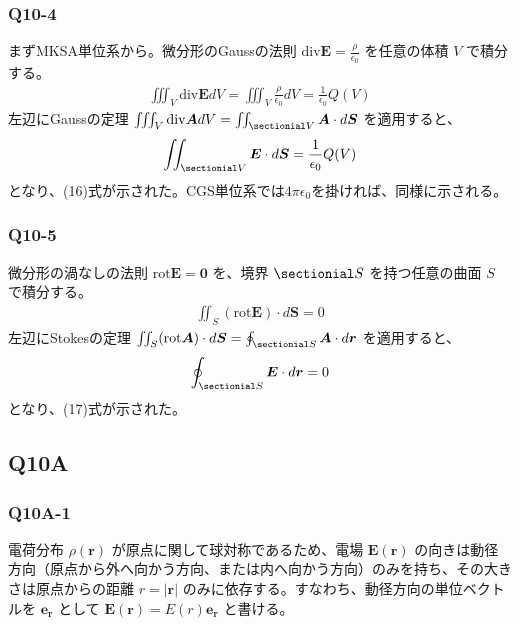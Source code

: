 \documentclass[platex,dvipdfmx,a4paper]{jsarticle}
\newcommand{\vect}[1]{\boldsymbol{#1}}
\begin{document}
  \subsubsection*{Q10-4}
  まずMKSA単位系から。微分形のGaussの法則 $\text{div} \vect{E} = \frac{\rho}{\epsilon_0}$ を任意の体積 $V$ で積分する。
  \begin{align*}
    \iiint_V \text{div} \vect{E} dV = \iiint_V \frac{\rho}{\epsilon_0} dV = \frac{1}{\epsilon_0} Q(V)
  \end{align*}
  左辺にGaussの定理 $\iiint_V \text{div} \vect{A} dV = \iint_{\sectionial V} \vect{A} \cdot d\vect{S}$ を適用すると、
  \begin{align*}
    \iint_{\sectionial V} \vect{E} \cdot d\vect{S} = \frac{1}{\epsilon_0} Q(V)
  \end{align*}
  となり、(16)式が示された。CGS単位系では$4\pi\epsilon_0$を掛ければ、同様に示される。

  \subsubsection*{Q10-5}
  微分形の渦なしの法則 $\text{rot} \vect{E} = \vect{0}$ を、境界 $\sectionial S$ を持つ任意の曲面 $S$ で積分する。
  \begin{align*}
    \iint_S (\text{rot} \vect{E}) \cdot d\vect{S} = 0
  \end{align*}
  左辺にStokesの定理 $\iint_S (\text{rot} \vect{A}) \cdot d\vect{S} = \oint_{\sectionial S} \vect{A} \cdot d\vect{r}$ を適用すると、
  \begin{align*}
    \oint_{\sectionial S} \vect{E} \cdot d\vect{r} = 0
  \end{align*}
  となり、(17)式が示された。
  
  \subsection*{Q10A}
  \subsubsection*{Q10A-1}
  電荷分布 $\rho(\vect{r})$ が原点に関して球対称であるため、電場 $\vect{E}(\vect{r})$ の向きは動径方向（原点から外へ向かう方向、または内へ向かう方向）のみを持ち、その大きさは原点からの距離 $r = |\vect{r}|$ のみに依存する。すなわち、動径方向の単位ベクトルを $\vect{e_r}$ として $\vect{E}(\vect{r}) = E(r)\vect{e_r}$ と書ける。
\end{document}
